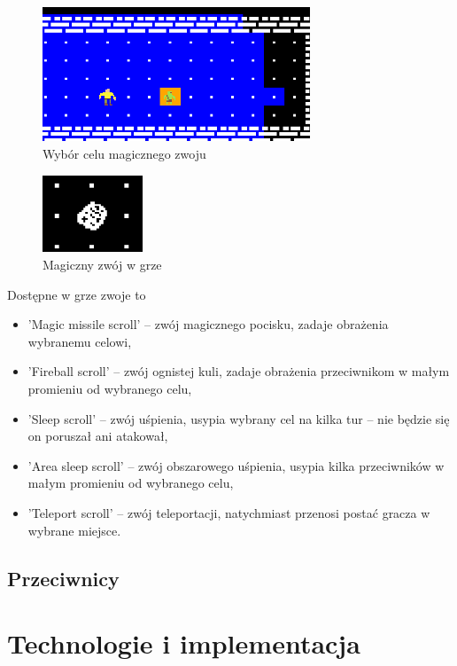 \documentclass[12pt,twoside]{article}
\begin{document}
\FloatBarrier
\begin{figure}[h]
	\centering
	\includegraphics[width=8cm]{images/mygame/targeting.png}
	\caption{Wybór celu magicznego zwoju}
	\label{mygame:targeting}
\end{figure}
\FloatBarrier

\FloatBarrier
\begin{figure}[h]
	\centering
	\includegraphics[width=3cm]{images/mygame/scroll.png}
	\caption{Magiczny zwój w grze}
	\label{mygame:scroll}
\end{figure}
\FloatBarrier

Dostępne w grze zwoje to 
\begin{itemize}
	\item 'Magic missile scroll' -- zwój magicznego pocisku, zadaje obrażenia wybranemu celowi,
	\item 'Fireball scroll' -- zwój ognistej kuli, zadaje obrażenia przeciwnikom w małym promieniu od wybranego celu,			
	\item 'Sleep scroll' -- zwój uśpienia, usypia wybrany cel na kilka tur -- nie będzie się on poruszał ani atakował,
	\item 'Area sleep scroll' -- zwój obszarowego uśpienia, usypia kilka przeciwników w małym promieniu od wybranego celu,
	\item 'Teleport scroll' -- zwój teleportacji, natychmiast przenosi postać gracza w wybrane miejsce.	
\end{itemize}

\subsection{Przeciwnicy}


\clearpage	



\section{Technologie i implementacja}
\end{document}
